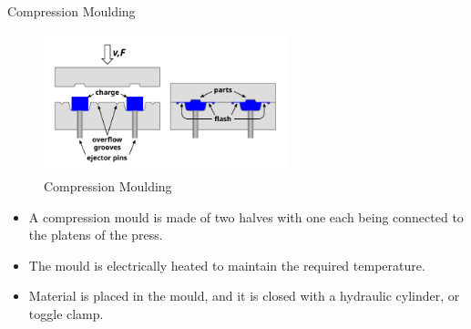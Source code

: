 \documentclass[11pt,t]{beamer}
\begin{document}
    \begin{frame}[allowframebreaks]{Compression Moulding}
        \begin{figure}
            \vspace*{-10pt}
            \begin{center}
                \includegraphics[width=200pt]{compression_molding}
            \end{center}
            \caption{Compression Moulding}\label{fig:fig-2}
            \vspace*{-10pt}
        \end{figure}
        \begin{itemize}
            \item A compression mould is made of two halves with one each being connected to the platens of the press.
            \item The mould is electrically heated to maintain the required temperature.
            \item Material is placed in the mould, and it is closed with a hydraulic cylinder, or toggle clamp.
        \end{itemize}

        \framebreak


\end{frame}
\end{document}
